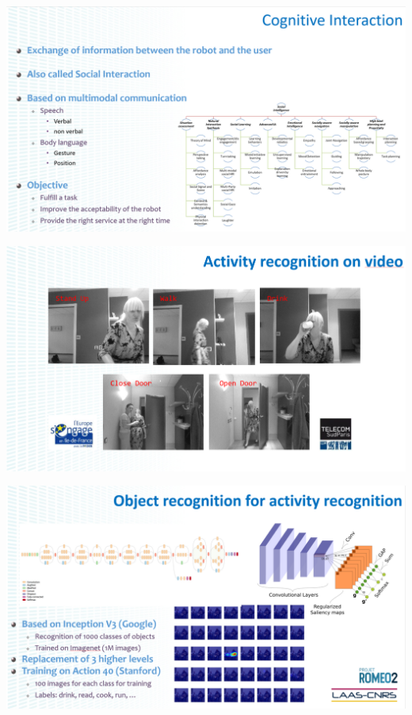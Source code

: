 \documentclass[xetex,mathserif,serif]{beamer}
\begin{document}
	\begin{frame}
		\begin{center}
			\includegraphics[width=\textwidth]{gelin15.png}
		\end{center}
	\end{frame}

	\begin{frame}
		\begin{center}
			\includegraphics[width=\textwidth]{gelin16.png}
		\end{center}
	\end{frame}

	\begin{frame}
		\begin{center}
			\includegraphics[width=\textwidth]{gelin17.png}
		\end{center}
	\end{frame}
\end{document}
